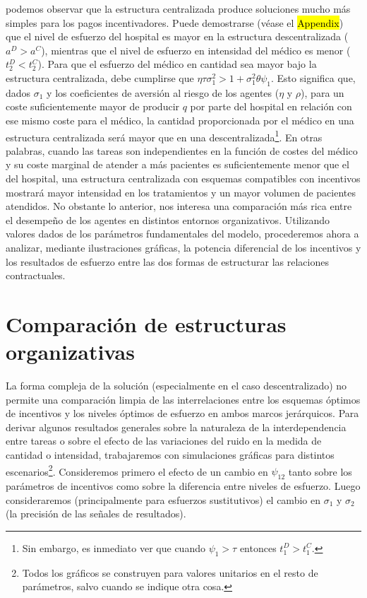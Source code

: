 ﻿\documentclass[12pt,letterpaper]{article}
\begin{document}
podemos observar que la estructura centralizada produce soluciones mucho más simples para los pagos incentivadores. Puede demostrarse (véase el \hl{Appendix}) que el nivel de esfuerzo del hospital es mayor en la estructura descentralizada ($a^D>a^C$), mientras que el nivel de esfuerzo en intensidad del médico es menor ($t_2^D<t_2^C$). Para que el esfuerzo del médico en cantidad sea mayor bajo la estructura centralizada, debe cumplirse que $\eta\tau\sigma_1^2>1+\sigma_1^2\theta\psi_1$. Esto significa que, dados $\sigma_1$ y los coeficientes de aversión al riesgo de los agentes ($\eta$ y $\rho$), para un coste suficientemente mayor de producir $q$ por parte del hospital en relación con ese mismo coste para el médico, la cantidad proporcionada por el médico en una estructura centralizada será mayor que en una descentralizada\footnote{Sin embargo, es inmediato ver que cuando $\psi_1>\tau$ entonces $t_1^D>t_1^C$.}. En otras palabras, cuando las tareas son independientes en la función de costes del médico y su coste marginal de atender a más pacientes es suficientemente menor que el del hospital, una estructura centralizada con esquemas compatibles con incentivos mostrará mayor intensidad en los tratamientos y un mayor volumen de pacientes atendidos. No obstante lo anterior, nos interesa una comparación más rica entre el desempeño de los agentes en distintos entornos organizativos. Utilizando valores dados de los parámetros fundamentales del modelo, procederemos ahora a analizar, mediante ilustraciones gráficas, la potencia diferencial de los incentivos y los resultados de esfuerzo entre las dos formas de estructurar las relaciones contractuales.

\section{Comparación de estructuras organizativas}
La forma compleja de la solución (especialmente en el caso descentralizado) no permite una comparación limpia de las interrelaciones entre los esquemas óptimos de incentivos y los niveles óptimos de esfuerzo en ambos marcos jerárquicos. Para derivar algunos resultados generales sobre la naturaleza de la interdependencia entre tareas o sobre el efecto de las variaciones del ruido en la medida de cantidad o intensidad, trabajaremos con simulaciones gráficas para distintos escenarios\footnote{Todos los gráficos se construyen para valores unitarios en el resto de parámetros, salvo cuando se indique otra cosa.}. Consideremos primero el efecto de un cambio en $\psi_{12}$ tanto sobre los parámetros de incentivos como sobre la diferencia entre niveles de esfuerzo. Luego consideraremos (principalmente para esfuerzos sustitutivos) el cambio en $\sigma_1$ y $\sigma_2$ (la precisión de las señales de resultados).
\end{document}
